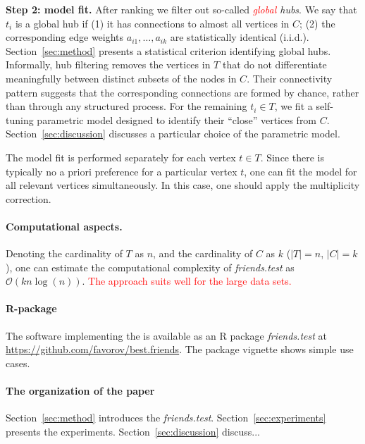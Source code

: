 \documentclass{llncs}
\begin{document}
\textbf{Step 2: model fit.} After ranking we filter out so-called \textit{\textcolor{red}{global} hubs}. We say that $t_i $ is a global hub if (1) it has connections to almost all vertices in $C$; (2) the corresponding edge weights $a_{i1}, \dots, a_{ik}$ are statistically identical (i.i.d.). Section~\ref{sec:method} presents a statistical criterion identifying global hubs. Informally, hub filtering removes the vertices in 
$T$ that do not differentiate meaningfully between distinct subsets of the nodes in $C$. Their connectivity pattern suggests that the corresponding connections are formed by chance, rather than through any structured process.  
For the remaining $t_i\in T$, we fit a self-tuning parametric model designed to identify their ``close'' vertices from $C$. Section~\ref{sec:discussion} discusses a particular choice of the parametric model.

The model fit is performed separately for each vertex $t\in T$. Since there is typically no a priori preference for a particular vertex $t$, one can fit the model for all relevant vertices simultaneously. In this case, one should apply the multiplicity correction. 

\paragraph{Computational aspects.} Denoting the cardinality of $T$ as $n$, and the cardinality of $C$ as $k$ ($|T| = n$, $|C| = k$), one can estimate the computational complexity of \textit{friends.test} as $\mathcal{O}(kn\log(n))$.
\textcolor{red}{The approach suits well for the large data sets.}

\paragraph{R-package}
The software implementing the  is available as an \textsf{R} package \textit{friends.test} at 
\url{https://github.com/favorov/best.friends}. The package vignette shows simple use cases.


\paragraph{The organization of the paper} Section~\ref{sec:method} introduces the \textit{friends.test}. Section~\ref{sec:experiments} presents the experiments. Section~\ref{sec:discussion} discuss...
\end{document}
